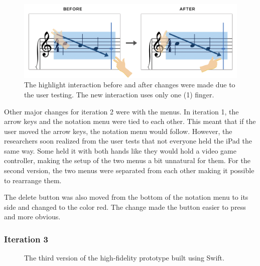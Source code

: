 				\begin{figure}[h]
					\centering
					\includegraphics[scale=0.25]{figures/before-after-highlight.png}
				    \caption{The highlight interaction before and after changes were made due to the user testing. The new interaction uses only one (1) finger.}
				    \label{fig:highlight}
				\end{figure}

				Other major changes for iteration 2 were with the menus. In iteration 1, the arrow keys and the notation menu were tied to each other. This meant that if the user moved the arrow keys, the notation menu would follow. However, the researchers soon realized from the user tests that not everyone held the iPad the same way. Some held it with both hands like they would hold a video game controller, making the setup of the two menus a bit unnatural for them. For the second version, the two menus were separated from each other making it possible to rearrange them. 


				The delete button was also moved from the bottom of the notation menu to its side and changed to the color red. The change made the button easier to press and more obvious. 

			\subsubsection{Iteration 3}

				\begin{figure}[H]
					\centering
				    \caption{The third version of the high-fidelity prototype built using Swift.}
				    \label{fig:flow_it3}
				\end{figure} 

